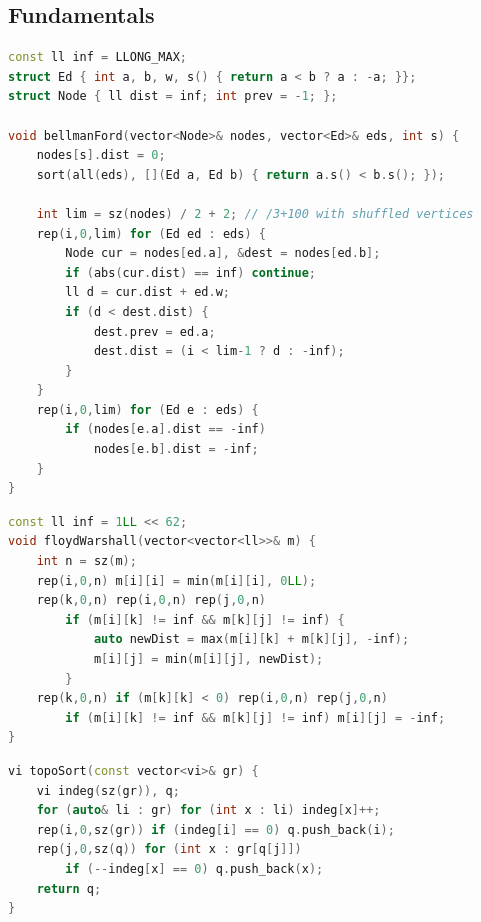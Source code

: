 \begin{multicols}{\Columns}
\subsection{Fundamentals}
\begin{lstlisting}[language=C++]
const ll inf = LLONG_MAX;
struct Ed { int a, b, w, s() { return a < b ? a : -a; }};
struct Node { ll dist = inf; int prev = -1; };

void bellmanFord(vector<Node>& nodes, vector<Ed>& eds, int s) {
	nodes[s].dist = 0;
	sort(all(eds), [](Ed a, Ed b) { return a.s() < b.s(); });

	int lim = sz(nodes) / 2 + 2; // /3+100 with shuffled vertices
	rep(i,0,lim) for (Ed ed : eds) {
		Node cur = nodes[ed.a], &dest = nodes[ed.b];
		if (abs(cur.dist) == inf) continue;
		ll d = cur.dist + ed.w;
		if (d < dest.dist) {
			dest.prev = ed.a;
			dest.dist = (i < lim-1 ? d : -inf);
		}
	}
	rep(i,0,lim) for (Ed e : eds) {
		if (nodes[e.a].dist == -inf)
			nodes[e.b].dist = -inf;
	}
}
\end{lstlisting}

\begin{lstlisting}[language=C++]
const ll inf = 1LL << 62;
void floydWarshall(vector<vector<ll>>& m) {
	int n = sz(m);
	rep(i,0,n) m[i][i] = min(m[i][i], 0LL);
	rep(k,0,n) rep(i,0,n) rep(j,0,n)
		if (m[i][k] != inf && m[k][j] != inf) {
			auto newDist = max(m[i][k] + m[k][j], -inf);
			m[i][j] = min(m[i][j], newDist);
		}
	rep(k,0,n) if (m[k][k] < 0) rep(i,0,n) rep(j,0,n)
		if (m[i][k] != inf && m[k][j] != inf) m[i][j] = -inf;
}
\end{lstlisting}

\begin{lstlisting}[language=C++]
vi topoSort(const vector<vi>& gr) {
	vi indeg(sz(gr)), q;
	for (auto& li : gr) for (int x : li) indeg[x]++;
	rep(i,0,sz(gr)) if (indeg[i] == 0) q.push_back(i);
	rep(j,0,sz(q)) for (int x : gr[q[j]])
		if (--indeg[x] == 0) q.push_back(x);
	return q;
}
\end{lstlisting}



\end{multicols}
